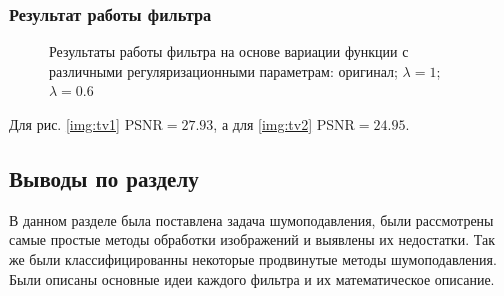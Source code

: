 \subsubsection{Результат работы фильтра}


\begin{figure}[H]
	\centering
	\hspace{0.0125ex}
	\hspace{0.0125ex}
	\caption{Результаты работы фильтра на основе вариации функции с различными регуляризационными параметрам:  оригинал;  $\lambda=1$;  $\lambda=0.6$}
\end{figure}
Для рис. \ref{img:tv1} PSNR$=27.93$, а для \ref{img:tv2} PSNR$=24.95$.

\subsection{Выводы по разделу}
В данном разделе была поставлена задача шумоподавления, были рассмотрены самые простые методы обработки изображений и выявлены их недостатки. Так же были классифицированны некоторые продвинутые методы шумоподавления. Были описаны основные идеи каждого фильтра и их математическое описание.